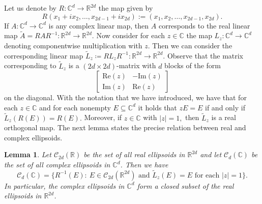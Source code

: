 \documentclass{article}
\newtheorem{lemma}[theorem]{Lemma}
\theoremstyle{definition}
\theoremstyle{remark}
\numberwithin{equation}{section}
\newcommand{\reals}{\mathbb{R}}
\newcommand{\complex}{\mathbb{C}}
\newcommand{\1}{\mathbf{1}}
\begin{document}
    Let us denote by $R:\complex^{d}\to\reals^{2d}$ the map given by
    \begin{equation*}
    	R(x_1+ix_2,\ldots,x_{2d-1}+ix_{2d}):=(x_1,x_2,\ldots,x_{2d-1},x_{2d}).
    \end{equation*}
    If $A:\complex^{d}\to\complex^{d}$ is any complex linear map, then $A$ corresponds to the real linear map $\widetilde{A} = RAR^{-1}:\reals^{2d}\to\reals^{2d}.$
    Now consider for each $z\in\complex$ the map $L_{z}:\complex^{d}\to\complex^{d}$ denoting componentwise multiplication with $z.$
    Then we can consider the corresponding linear map $\widetilde{L}_{z} \coloneq RL_{z}R^{-1}:\reals^{2d}\to\reals^{2d}.$
    Observe that the matrix corresponding to $\widetilde{L}_{z}$ is a $(2d \times 2d)$-matrix with $d$ blocks of the form
    \begin{equation*}
        \begin{bmatrix}
        	\mathrm{Re}(z) & -\mathrm{Im}(z)\\
        	\mathrm{Im}(z) & \mathrm{Re}(z)
        \end{bmatrix}
    \end{equation*}
    on the diagonal.
    With the notation that we have introduced, we have that for each $z\in\complex$ and for each nonempty $E \subseteq \complex^d$ it holds that $zE=E$ if and only if $\widetilde{L}_{z}(R(E))=R(E).$
    Moreover, if $z\in\complex$ with $|z|=1,$ then $\widetilde{L}_{z}$ is a real orthogonal map.
    The next lemma states the precise relation between real and complex ellipsoids.

     \begin{lemma}
         \label{lem:complex_vs_real_ellipsoids}
          Let $\mathcal{C}_{2d}(\reals)$ be the set of all real ellipsoids in $\reals^{2d}$ and let $\mathcal{C}_{d}(\complex)$ be the set of all complex ellipsoids in $\complex^{d}$. Then we have
     \begin{equation}
     	\label{eq:complex_ellipsoids}
     	\mathcal{C}_{d}(\complex) = \{R^{-1}(E):~E\in\mathcal{C}_{2d}(\reals^{2d})\text{ and }\widetilde{L}_{z}(E)=E \text{ for each } |z| = 1\}.
     \end{equation}
     In particular, the complex ellipsoids in $\complex^d$ form a closed subset of the real ellipsoids in $\reals^{2d}$.
     \end{lemma}
     
\end{document}

